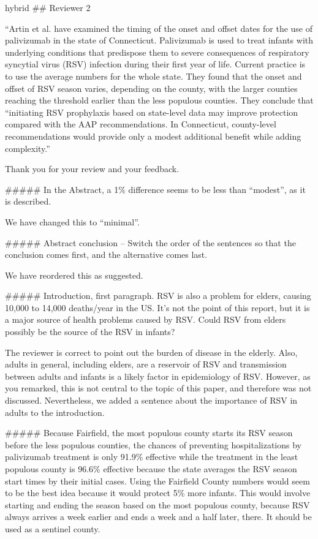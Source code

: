 \documentclass{article}
\begin{document}
\begin{markdown*}{hybrid}
## Reviewer 2

\begin{displayquote}
“Artin et al. have examined the timing of the onset and offset dates for the use of palivizumab in the state of Connecticut. Palivizumab is used to treat infants with underlying conditions that predispose them to severe consequences of respiratory syncytial virus (RSV) infection during their first year of life. Current practice is to use the average numbers for the whole state. They found that the onset and offset of RSV season varies, depending on the county, with the larger counties reaching the threshold earlier than the less populous counties. They conclude that “initiating RSV prophylaxis based on state-level data may improve protection compared with the AAP recommendations. In Connecticut, county-level recommendations would provide only a modest additional benefit while adding complexity.”
\end{displayquote}

Thank you for your review and your feedback. 

##### In the Abstract, a 1\% difference seems to be less than “modest”, as it is described.

We have changed this to “minimal”.

##### Abstract conclusion – Switch the order of the sentences so that the conclusion comes first, and the alternative comes last.

We have reordered this as suggested.

##### Introduction, first paragraph. RSV is also a problem for elders, causing 10,000 to 14,000 deaths/year in the US. It’s not the point of this report, but it is a major source of health problems caused by RSV. Could RSV from elders possibly be the source of the RSV in infants?

The reviewer is correct to point out the burden of disease in the elderly. Also, adults in general, including elders, are a reservoir of RSV and transmission between adults and infants is a likely factor in epidemiology of RSV. However, as you remarked, this is not central to the topic of this paper, and therefore was not discussed. Nevertheless, we added a sentence about the importance of RSV in adults to the introduction. 

##### Because Fairfield, the most populous county starts its RSV season before the less populous counties, the chances of preventing hospitalizations by palivizumab treatment is only 91.9\% effective while the treatment in the least populous county is 96.6\% effective because the state averages the RSV season start times by their initial cases. Using the Fairfield County numbers would seem to be the best idea because it would protect 5\% more infants. This would involve starting and ending the season based on the most populous county, because RSV always arrives a week earlier and ends a week and a half later, there. It should be used as a sentinel county.


\end{markdown*}
\end{document}
